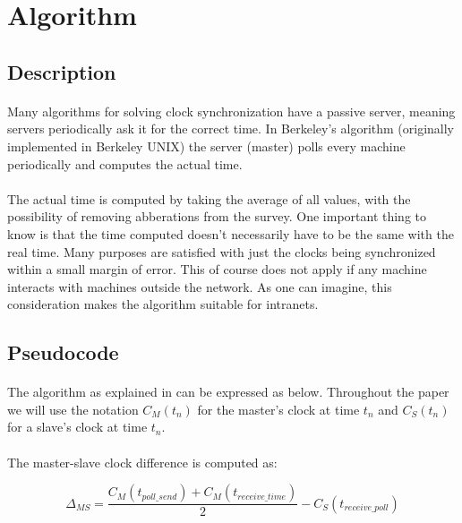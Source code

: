 \documentclass[12pt]{article}
\begin{document}
\section{Algorithm}

\subsection{Description}
\paragraph{}
Many algorithms for solving clock synchronization have a passive server, meaning servers periodically ask it for the correct time. In Berkeley's algorithm (originally implemented in Berkeley UNIX) the server (master) polls every machine periodically and computes the actual time.

\paragraph{}
The actual time is computed by taking the average of all values, with the possibility of removing abberations from the survey. One important thing to know is that the time computed doesn't necessarily have to be the same with the real time. Many purposes are satisfied with just the clocks being synchronized within a small margin of error. This of course does not apply if any machine interacts with machines outside the network. As one can imagine, this consideration makes the algorithm suitable for intranets.


\subsection{Pseudocode}
\paragraph{}
The algorithm as explained in \cite{gusella1989accuracy} can be expressed as below. Throughout the paper we will use the notation $C_{M}(t_{n})$ for the master's clock at time $t_{n}$ and $C_{S}(t_{n})$ for a slave's clock at time $t_{n}$. 
\paragraph{}
The master-slave clock difference is computed as:

	$$
		\varDelta_{MS} = \frac{C_{M}(t_{poll\_send}) + C_{M}(t_{receive\_time})}{2} -C_{S}(t_{receive\_poll}) 
	$$
	
\end{document}
